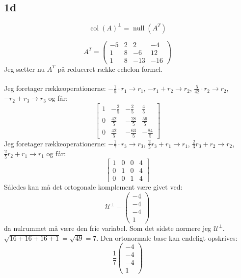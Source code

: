 \documentclass{article}
\begin{document}
\subsection*{1d}
$$
\operatorname{col}(A)^{\perp}=\operatorname{null}\left(A^T\right)
$$

$$
A^T=\left(\begin{array}{cccc}
-5 & 2 & 2 & -4 \\
1 & 8 & -6 & 12 \\
1 & 8 & -13 & -16
\end{array}\right)
$$
Jeg sætter nu $A^T$ på reduceret række echelon formel. 
\\
\\
Jeg foretager rækkeoperationerne: $-\frac{1}{5} \cdot r_1 \rightarrow r_1$, $-r_1+r_2 \rightarrow r_2$, $\frac{5}{42} \cdot r_2 \rightarrow r_2$, $-r_2+r_3 \rightarrow r_3$ og får:
$$
\left[\begin{array}{cccc}
1 & -\frac{2}{5} & -\frac{2}{5} & \frac{4}{5} \\
0 & \frac{42}{5} & -\frac{28}{5} & \frac{56}{5} \\
0 & \frac{42}{5} & -\frac{63}{5} & -\frac{84}{5}
\end{array}\right]
$$
Jeg foretager rækkeoperationerne: $-\frac{1}{7} \cdot r_3 \rightarrow r_3$, $\frac{2}{5} r_3+r_1 \rightarrow r_1$, $\frac{2}{3} r_3+r_2 \rightarrow r_2$, $\frac{2}{5} r_2+r_1 \rightarrow r_1$ og får:
$$
\left[\begin{array}{llll}
1 & 0 & 0 & 4 \\
0 & 1 & 0 & 4 \\
0 & 0 & 1 & 4
\end{array}\right]
$$
Således kan må det ortogonale komplement være givet ved:
$$
\mathcal{U}^{\perp}=\left(\begin{array}{c}
-4 \\
-4 \\
-4 \\
1
\end{array}\right)
$$
da nulrummet må være den frie variabel. Som det sidste normere jeg $\mathcal{U}^{\perp}$. $\sqrt{16+16+16+1}=\sqrt{49}=7$. Den ortonormale base kan endeligt opskrives:
$$
\frac{1}{7}\left(\begin{array}{c}
-4 \\
-4 \\
-4 \\
1
\end{array}\right)
$$
\end{document}
